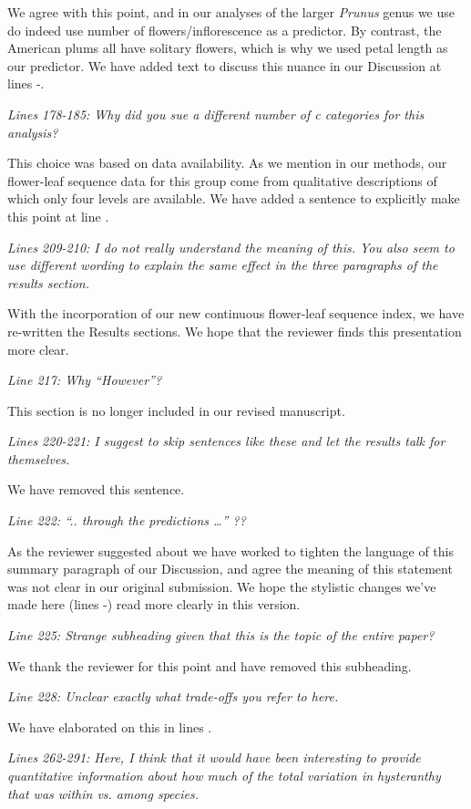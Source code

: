 \documentclass{article}[12pt]
\begin{document}
We agree with this point, and in our analyses of the larger \emph{Prunus} genus we use do indeed use number of flowers/inflorescence as a predictor. By contrast, the American plums all have solitary flowers, which is why we used petal length as our predictor. We have added text to discuss this nuance in our Discussion at lines -.

\emph{Lines 178-185: Why did you sue a different number of c categories for this analysis?}

This choice was based on data availability. As we mention in our methods, our flower-leaf sequence data for this group come from qualitative descriptions of which only four levels are available. We have added a sentence to explicitly make this point at line .

\emph{Lines 209-210: I do not really understand the meaning of this. You also seem to use different wording to explain the same effect in the three paragraphs of the results section.}

With the incorporation of our new continuous flower-leaf sequence index, we have re-written the Results sections. We hope that the reviewer finds this presentation more clear.

\emph{Line 217: Why “However”?}

This section is no longer included in our revised manuscript.

\emph{Lines 220-221: I suggest to skip sentences like these and let the results talk for themselves.}

We have removed this sentence.

\emph{Line 222: “.. through the predictions …” ??}

As the reviewer suggested about we have worked to tighten the language of this summary paragraph of our Discussion, and agree the meaning of this statement was not clear in our original submission. We hope the stylistic changes we've made here (lines -) read more clearly in this version.

\emph{Line 225: Strange subheading given that this is the topic of the entire paper?}

We thank the reviewer for this point and have removed this subheading.


\emph{Line 228: Unclear exactly what trade-offs you refer to here.}

We have elaborated on this in lines .

\emph{Lines 262-291: Here, I think that it would have been interesting to provide quantitative information about how much of the total variation in hysteranthy that was within vs. among species.}
\end{document}
